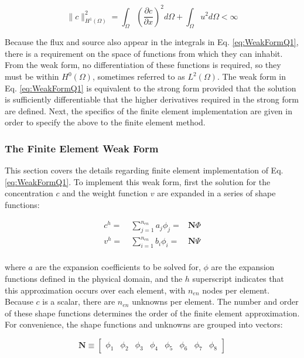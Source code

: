 \documentclass[10pt]{article}
\begin{document}
\begin{equation}
\|c\|^2_{{H}^1(\Omega)}=\int_{\Omega}\left(\frac{\partial c}{\partial x}\right)^2d\Omega+\int_{\Omega}u^2d\Omega<\infty
\end{equation}

Because the flux and source also appear in the integrals in Eq. \eqref{eq:WeakFormQ1}, there is a requirement on the space of functions from which they can inhabit. From the weak form, no differentiation of these functions is required, so they must be within \(H^0(\Omega)\), sometimes referred to as \(L^2(\Omega)\). The weak form in Eq. \eqref{eq:WeakFormQ1} is equivalent to the strong form provided that the solution is sufficiently differentiable that the higher derivatives required in the strong form are defined. Next, the specifics of the finite element implementation are given in order to specify the above to the finite element method.

\subsubsection{The Finite Element Weak Form}

This section covers the details regarding finite element implementation of Eq. \eqref{eq:WeakFormQ1}. To implement this weak form, first the solution for the concentration \(c\) and the weight function \(v\) are expanded in a series of shape functions:

\begin{equation}
\begin{aligned}
c^h=&\ \sum_{j=1}^{n_{en}}a_j\phi_j=&\textbf{N}\Phi\\
v^h=&\ \sum_{i=1}^{n_{en}}b_i\phi_i=&\textbf{N}\Psi\\
\end{aligned}
\end{equation}

where \(a\) are the expansion coefficients to be solved for, \(\phi\) are the expansion functions defined in the physical domain, and the \(h\) superscript indicates that this approximation occurs over each element, with \(n_{en}\) nodes per element. Because \(c\) is a scalar, there are \(n_{en}\) unknowns per element. The number and order of these shape functions determines the order of the finite element approximation. For convenience, the shape functions and unknowns are grouped into vectors:

\begin{equation}
\textbf{N}\equiv\begin{bmatrix}\phi_1 & \phi_2 & \phi_3 & \phi_4 & \phi_5 & \phi_6 & \phi_7 & \phi_8\end{bmatrix}
\end{equation}
\end{document}

